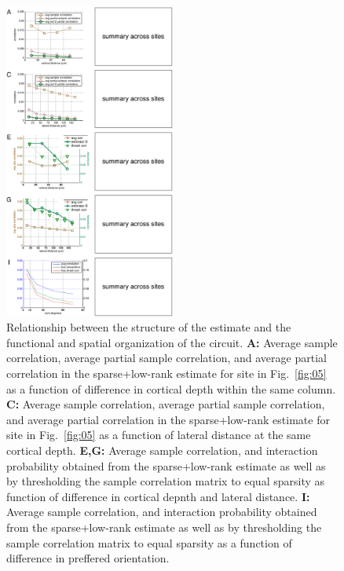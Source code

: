 \begin{figure}[htp]
\centering
\includegraphics[width=0.5\textwidth]{figures/Figure6.pdf}
\caption{
Relationship between the structure of the estimate and the functional and spatial organization of the circuit.
{\bf A:} Average sample correlation, average partial sample correlation, and average partial correlation in the sparse+low-rank estimate for site in Fig.~\ref{fig:05} as a function of difference in cortical depth within the same column.
{\bf C:} Average sample correlation, average partial sample correlation, and average partial correlation in the sparse+low-rank estimate for site in Fig.~\ref{fig:05} as a function of lateral distance at the same cortical depth.
{\bf E,G:} Average sample correlation, and interaction probability obtained from the sparse+low-rank estimate as well as by thresholding the sample correlation matrix to equal sparsity as function of difference in cortical depnth and lateral distance.
{\bf I:} Average sample correlation, and interaction probability obtained from the sparse+low-rank estimate as well as by thresholding the sample correlation matrix to equal sparsity as a function of difference in preffered orientation.
}
\label{fig:06}
\end{figure}
